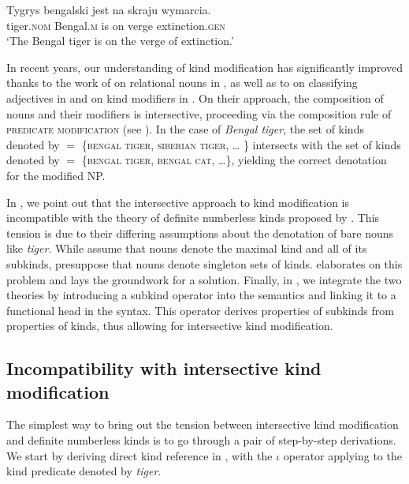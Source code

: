 \documentclass[output=paper]{langscibook}
\begin{document}
\ea \label{ex:subkind_2} \gll
Tygrys bengalski jest na skraju wymarcia.\\
tiger.\textsc{nom} Bengal.\textsc{m} is on verge extinction.\textsc{gen}\\
\glt `The Bengal tiger is on the verge of extinction.'
\z

\noindent
In recent years, our understanding of kind modification has significantly improved thanks to the work of \citet{McNally.Boleda2004} on relational nouns in , as well as to \citet{Wagiel2014} on classifying adjectives in  and \citet{Borik.Espinal2015} on kind modifiers in . On their approach, the composition of nouns and their modifiers is intersective, proceeding via the composition rule of \textsc{predicate modification} (see \citealt{Heim.Kratzer1998}). In the case of \textit{Bengal tiger}, the set of kinds denoted by  $=$ \{\textsc{bengal tiger}, \textsc{siberian tiger}, {\dots} \} intersects with the set of kinds denoted by   $=$ \{\textsc{bengal tiger}, \textsc{bengal cat}, {\dots}\}, yielding the correct denotation for the modified NP.

In , we point out that the intersective approach to kind modification is incompatible with the theory of definite numberless kinds proposed by \citet{Borik.Espinal2012, Borik.Espinal2015}. This tension is due to their differing assumptions about the denotation of bare nouns like \textit{tiger}. While \citet{McNally.Boleda2004} assume that nouns denote the maximal kind and all of its subkinds, \citet{Borik.Espinal2012} presuppose that nouns denote singleton sets of kinds.  elaborates on this problem and lays the groundwork for a solution. Finally, in , we integrate the two theories by introducing a subkind operator into the semantics and linking it to a functional head in the syntax. This operator derives properties of subkinds from properties of kinds, thus allowing for intersective kind modification.


\subsection{Incompatibility with intersective kind modification}
\label{sec:problem-intersec}

The simplest way to bring out the tension between intersective kind modification and definite numberless kinds is to go through a pair of step-by-step derivations. We start by deriving direct kind reference in , with the $\iota$ operator applying to the kind predicate denoted by \textit{tiger}.
\end{document}
